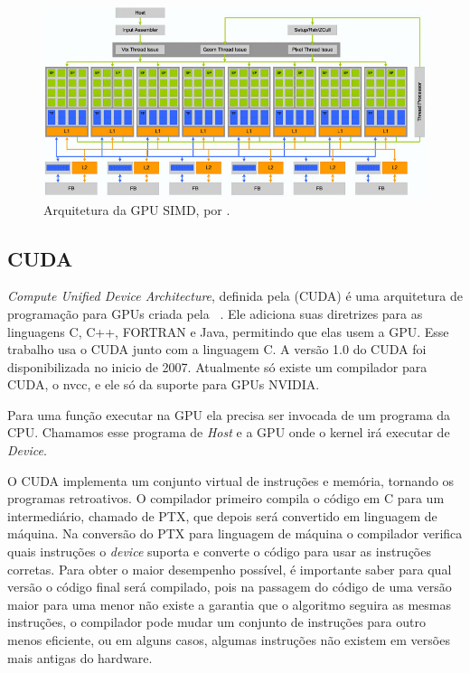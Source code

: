 \begin{figure}[H]
    \centering
    \includegraphics[width=1\textwidth]{figuras/simd.jpg}
    \caption{Arquitetura da GPU SIMD, por \citep{blythe2008rise}.}
    \label{fig:simd}
\end{figure}

\subsection{CUDA}
\textit{Compute Unified Device Architecture}, definida pela (CUDA) é uma arquitetura de programação para GPUs criada 
pela ~\cite{nvidia2007compute}.
Ele adiciona suas diretrizes para as linguagens C, C++, FORTRAN e Java, permitindo que elas usem a GPU.
Esse trabalho usa o CUDA junto com a linguagem C.
A versão 1.0 do CUDA foi disponibilizada no inicio de 2007. Atualmente só existe um compilador para CUDA, o nvcc,
e ele só da suporte para GPUs NVIDIA.

Para uma função executar na GPU ela precisa ser invocada de um programa da CPU. Chamamos esse programa de \textit{Host}
e a GPU onde o kernel irá executar de \textit{Device}.

O CUDA implementa um conjunto virtual de instruções e memória, tornando os programas retroativos. O compilador
primeiro compila o código em C para um intermediário, chamado de PTX, que depois será convertido em linguagem
de máquina. Na conversão do PTX para linguagem de máquina o compilador verifica quais instruções o \textit{device}
suporta e converte o código para usar as instruções corretas.
Para obter o maior desempenho possível, é importante saber para qual versão o código final será compilado, 
pois na passagem do código de uma versão maior para uma menor não existe a garantia que o algoritmo seguira as mesmas instruções, 
o compilador pode mudar um conjunto de instruções para outro menos eficiente, ou em alguns casos, algumas instruções não existem em
versões mais antigas do hardware.

